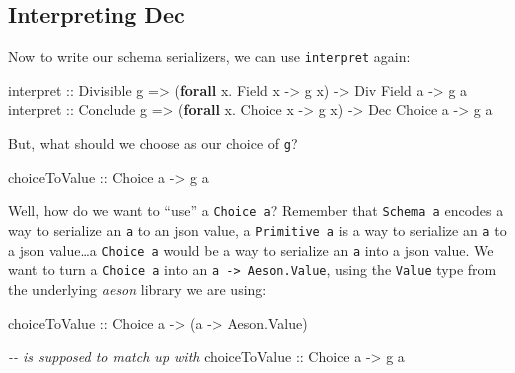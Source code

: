 \documentclass[]{article}
\newenvironment{Shaded}{}{}
\newcommand{\CommentTok}[1]{\textcolor[rgb]{0.38,0.63,0.69}{\textit{#1}}}
\newcommand{\DataTypeTok}[1]{\textcolor[rgb]{0.56,0.13,0.00}{#1}}
\newcommand{\KeywordTok}[1]{\textcolor[rgb]{0.00,0.44,0.13}{\textbf{#1}}}
\newcommand{\NormalTok}[1]{#1}
\newcommand{\OperatorTok}[1]{\textcolor[rgb]{0.40,0.40,0.40}{#1}}
\newcommand{\OtherTok}[1]{\textcolor[rgb]{0.00,0.44,0.13}{#1}}
\begin{document}
\hypertarget{interpreting-dec}{%
\subsection{Interpreting Dec}\label{interpreting-dec}}

Now to write our schema serializers, we can use \texttt{interpret} again:

\begin{Shaded}
\begin{Highlighting}[]
\OtherTok{interpret ::} \DataTypeTok{Divisible}\NormalTok{ g }\OtherTok{=>}\NormalTok{ (}\KeywordTok{forall}\NormalTok{ x}\OperatorTok{.} \DataTypeTok{Field}\NormalTok{  x }\OtherTok{{-}>}\NormalTok{ g x) }\OtherTok{{-}>} \DataTypeTok{Div} \DataTypeTok{Field}\NormalTok{  a }\OtherTok{{-}>}\NormalTok{ g a}
\OtherTok{interpret ::} \DataTypeTok{Conclude}\NormalTok{ g  }\OtherTok{=>}\NormalTok{ (}\KeywordTok{forall}\NormalTok{ x}\OperatorTok{.} \DataTypeTok{Choice}\NormalTok{ x }\OtherTok{{-}>}\NormalTok{ g x) }\OtherTok{{-}>} \DataTypeTok{Dec} \DataTypeTok{Choice}\NormalTok{ a }\OtherTok{{-}>}\NormalTok{ g a}
\end{Highlighting}
\end{Shaded}

But, what should we choose as our choice of \texttt{g}?

\begin{Shaded}
\begin{Highlighting}[]
\OtherTok{choiceToValue ::} \DataTypeTok{Choice}\NormalTok{ a }\OtherTok{{-}>}\NormalTok{ g a}
\end{Highlighting}
\end{Shaded}

Well, how do we want to ``use'' a \texttt{Choice\ a}? Remember that
\texttt{Schema\ a} encodes a way to serialize an \texttt{a} to an json value, a
\texttt{Primitive\ a} is a way to serialize an \texttt{a} to a json
value\ldots a \texttt{Choice\ a} would be a way to serialize an \texttt{a} into
a json value. We want to turn a \texttt{Choice\ a} into an
\texttt{a\ -\textgreater{}\ Aeson.Value}, using the \texttt{Value} type from the
underlying \emph{aeson} library we are using:

\begin{Shaded}
\begin{Highlighting}[]
\OtherTok{choiceToValue ::} \DataTypeTok{Choice}\NormalTok{ a }\OtherTok{{-}>}\NormalTok{ (a }\OtherTok{{-}>} \DataTypeTok{Aeson.Value}\NormalTok{)}

\CommentTok{{-}{-} is supposed to match up with}
\OtherTok{choiceToValue ::} \DataTypeTok{Choice}\NormalTok{ a }\OtherTok{{-}>}\NormalTok{ g a}
\end{Highlighting}
\end{Shaded}
\end{document}
